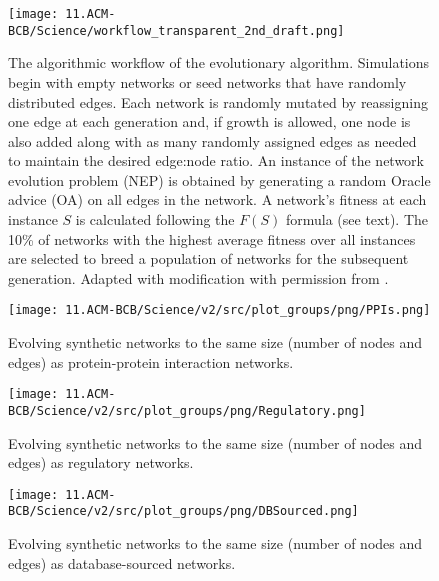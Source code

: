 \documentclass[12pt]{article}	%
\begin{document}
    \begin{figure}[H]
        \centering
        \texttt{[image: 11.ACM-BCB/Science/workflow\_transparent\_2nd\_draft.png]} %
                \caption{The algorithmic workflow of the evolutionary algorithm. Simulations begin with empty networks or seed networks that have randomly distributed edges. Each network is randomly mutated by reassigning one edge at each generation and, if growth is allowed, one node is also added along with as many randomly assigned edges as needed to maintain the desired edge:node ratio. An instance of the network evolution problem (NEP) is obtained by generating a random Oracle advice (OA) on all edges in the network. A network's fitness at each instance $S$ is calculated following the $F(S)$ formula (see text). The 10\% of networks with the highest average fitness over all instances are selected to breed a population of networks for the subsequent generation. Adapted with modification with permission from  \cite{atiia_computational_2017-1}.
                }
        \label{sup-workflow}
     \end{figure}





    	\begin{figure}[H]%
    			\centering
    					\texttt{[image: 11.ACM-BCB/Science/v2/src/plot\_groups/png/PPIs.png]}
    					\caption
                            {
                                Evolving synthetic networks to the same size (number of nodes and edges) as protein-protein interaction networks.
                            }
    					\label{fig:sim_evo_ppi}
    	\end{figure}

    	\begin{figure}[H]%
    			\centering
    					\texttt{[image: 11.ACM-BCB/Science/v2/src/plot\_groups/png/Regulatory.png]}
    					\caption
                            {
                                Evolving synthetic networks to the same size (number of nodes and edges)  as regulatory networks.
                            }
    					\label{fig:sim_evo_reg}
    	\end{figure}

    	\begin{figure}[H]%
    			\centering
    					\texttt{[image: 11.ACM-BCB/Science/v2/src/plot\_groups/png/DBSourced.png]}
    					\caption
                            {
                                Evolving synthetic networks to the same size (number of nodes and edges)  as database-sourced networks.
                            }
    					\label{fig:sim_evo_db}
    	\end{figure}
\clearpage %
\newpage
\end{document}
